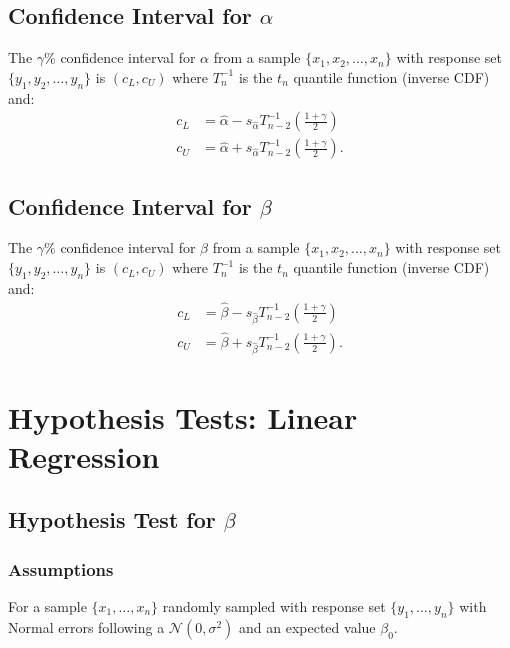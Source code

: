 \documentclass[a4paper, 12pt, twoside]{article}
\begin{document}
\subsection{Confidence Interval for $\alpha$}

The $\gamma\%$ confidence interval for $\alpha$ from a sample
$\{x_1, x_2, \ldots, x_n\}$ with response set
$\{y_1, y_2, \ldots, y_n\}$ is $(c_L, c_U)$ where $T^{-1}_n$ is the
$t_n$ quantile function (inverse CDF) and:
\begin{align*}
    c_L & = \hat\alpha - s_{\hat\alpha}
    T^{-1}_{n - 2}\left(\frac{1 + \gamma}{2}\right) \\
    c_U & = \hat\alpha + s_{\hat\alpha}
    T^{-1}_{n - 2}\left(\frac{1 + \gamma}{2}\right).
\end{align*}

\subsection{Confidence Interval for $\beta$}

The $\gamma\%$ confidence interval for $\beta$ from a sample
$\{x_1, x_2, \ldots, x_n\}$ with response set
$\{y_1, y_2, \ldots, y_n\}$ is $(c_L, c_U)$ where $T^{-1}_n$ is the
$t_n$ quantile function (inverse CDF) and:
\begin{align*}
    c_L & = \hat\beta - s_{\hat\beta}
    T^{-1}_{n - 2}\left(\frac{1 + \gamma}{2}\right) \\
    c_U & = \hat\beta + s_{\hat\beta}
    T^{-1}_{n - 2}\left(\frac{1 + \gamma}{2}\right).
\end{align*}

\section{Hypothesis Tests: Linear Regression}

\subsection{Hypothesis Test for $\beta$}

\subsubsection{Assumptions}

For a sample $\{x_1, \ldots, x_n\}$ randomly sampled with response
set $\{y_1, \ldots, y_n\}$ with Normal errors following a
$\mathcal{N}(0, \sigma^2)$ and an expected value $\beta_0$.
\end{document}
